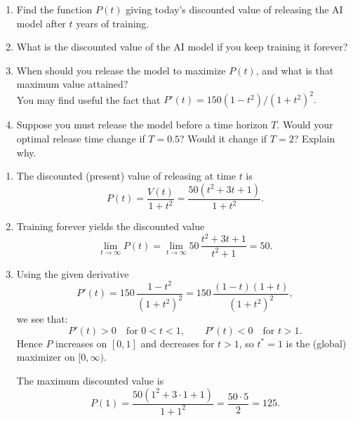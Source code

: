 \documentclass[11pt]{exam}
\begin{document}
\begin{questions}
\begin{enumerate}[leftmargin = 0.5cm, label = (\alph*), rightmargin = 0.2cm]
    
    \item Find the function $P(t)$ giving today's discounted value of releasing the AI model after $t$ years of training.

    \item What is the discounted value of the AI model if you keep training it forever?

    \item When should you release the model to maximize $P(t)$, and what is that maximum value attained? \\
    You may find useful the fact that
    $P'(t) = 150(1 - t^2)/(1 + t^2)^2.$

    \item Suppose you must release the model before a time horizon $T$. Would your optimal release time change if $T = 0.5$? Would it change if $T = 2$? Explain why.

\end{enumerate}

\begin{solution}[0cm]
\begin{enumerate}[leftmargin = 0.5cm, label = (\alph*), rightmargin = 0.2cm]

    \item The discounted (present) value of releasing at time $t$ is
    \[
        P(t) = \frac{V(t)}{1 + t^2}
             = \frac{50(t^2 + 3t + 1)}{1 + t^2}.
    \]

    \item Training forever yields the discounted value
    \[
        \lim_{t\to\infty} P(t)
        = \lim_{t\to\infty} 50\,\frac{t^2 + 3t + 1}{t^2 + 1}
        = 50.
    \]

    \item Using the given derivative
    \[
        P'(t) = 150\,\frac{1 - t^2}{(1 + t^2)^2}
              = 150\,\frac{(1 - t)(1 + t)}{(1 + t^2)^2},
    \]
    we see that:
    \[
        P'(t) > 0 \quad \text{for } 0 < t < 1, 
        \qquad
        P'(t) < 0 \quad \text{for } t > 1.
    \]
    Hence $P$ increases on $[0,1]$ and decreases for $t>1$, so $t^* = 1$ is the (global) maximizer on $[0,\infty)$.

    The maximum discounted value is
    \[
        P(1) = \frac{50(1^2 + 3\cdot 1 + 1)}{1 + 1^2}
             = \frac{50 \cdot 5}{2}
             = 125.
    \]


\end{enumerate}
\end{solution}
\end{questions}
\end{document}
